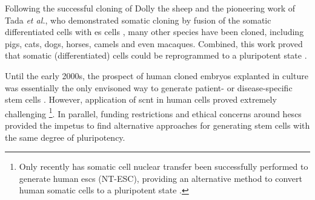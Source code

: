 Following the successful cloning of Dolly the sheep and the pioneering work of Tada \textit{et al.}, who demonstrated somatic cloning by fusion of the somatic differentiated cells with \gls{es} cells \cite{tada2001nuclear}, many other species have been cloned, including pigs, cats, dogs, horses, camels and even macaques.
Combined, this work proved that somatic (differentiated) cells could be reprogrammed to a pluripotent state \cite{cowan2005nuclear}.\\




\newpage

Until the early 2000s, the prospect of human cloned embryos explanted in culture was essentially the only envisoned way to generate patient- or disease-specific stem cells \cite{yamanaka2007strategies}.
However, application of \gls{scnt} in human cells proved extremely challenging \cite{fulka2013ups}\footnote{Only recently has somatic cell nuclear transfer been successfully performed to generate human \glspl{esc} (NT-ESC), providing an alternative method to convert human somatic cells to a pluripotent state \cite{tachibana2013human}.}. 
In parallel, funding restrictions and ethical concerns around \glspl{hesc} provided the impetus to find alternative approaches for generating stem cells with the same degree of pluripotency.

